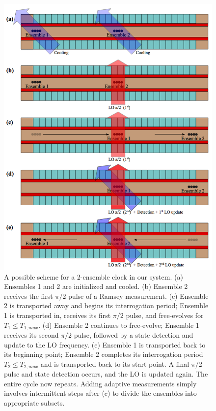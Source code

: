 \begin{figure}[hp]
    \begin{center}
        \includegraphics{figures/5/Fig_ClockScheme3}
        \caption{\label{fig:clockscheme} A possible scheme for a 2-ensemble clock in our system. (a) Ensembles 1 and 2 are initialized and cooled. (b) Ensemble 2 receives the first $\pi / 2$ pulse of a Ramsey measurement. (c) Ensemble 2 is transported away and begins its interrogation period; Ensemble 1 is transported in, receives its first $\pi / 2$ pulse, and free-evolves for $T_1 \leq T_{1,max}$. (d) Ensemble 2 continues to free-evolve; Ensemble 1 receives its second $\pi / 2$ pulse, followed by a state detection and update to the LO frequency. (e) Ensemble 1 is transported back to its beginning point; Ensemble 2 completes its interrogation period $T_2 \leq T_{2,max}$ and is transported back to its start point. A final $\pi /2$ pulse and state detection occurs, and the LO is updated again. The entire cycle now repeats. Adding adaptive measurements simply involves intermittent steps after (c) to divide the ensembles into appropriate subsets.   }
    \end{center}
\end{figure}

